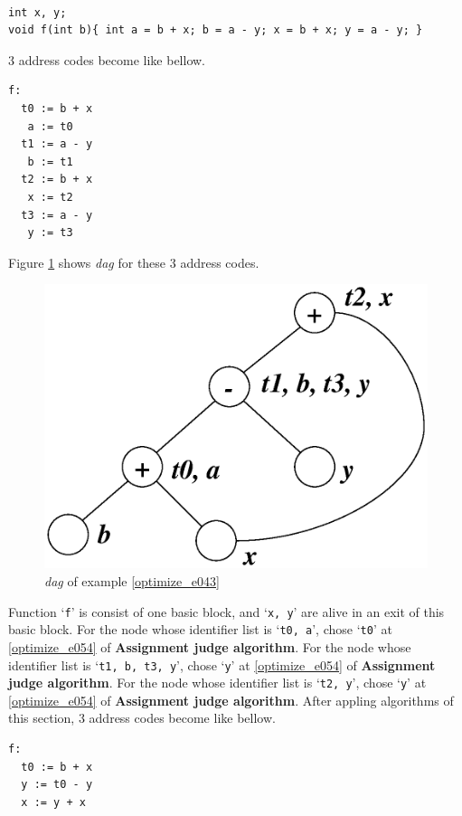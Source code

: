 \begin{Example}
\label{optimize_e043}
\begin{verbatim}

int x, y;
void f(int b){ int a = b + x; b = a - y; x = b + x; y = a - y; }
\end{verbatim}
3 address codes become like bellow.
\begin{verbatim}
f:
  t0 := b + x
   a := t0
  t1 := a - y
   b := t1
  t2 := b + x
   x := t2
  t3 := a - y
   y := t3
\end{verbatim}
Figure \ref{optimize_e044} shows {\em dag} for these 3 address codes.
\begin{figure}[htbp]
\begin{center}
\includegraphics[width=0.7\linewidth,height=0.540\linewidth]{opt023.eps}
\caption{{\em dag} of example \ref{optimize_e043}}
\label{optimize_e044}
\end{center}
\end{figure}
Function `{\tt{f}}' is consist of one basic block, and 
`{\tt{x, y}}' are alive in an exit of this basic block.
For the node whose identifier list is `{\tt{t0, a}}',
chose `{\tt{t0}}' at \ref{optimize_e054} of {\bf Assignment judge algorithm}.
For the node whose identifier list is `{\tt{t1, b, t3, y}}',
chose `{\tt{y}}' at \ref{optimize_e054} of {\bf Assignment judge algorithm}.
For the node whose identifier list is `{\tt{t2, y}}',
chose `{\tt{y}}' at \ref{optimize_e054} of {\bf Assignment judge algorithm}.
After appling algorithms of this section,
3 address codes become like bellow.
\begin{verbatim}
f:
  t0 := b + x
  y := t0 - y
  x := y + x
\end{verbatim}
\end{Example}


